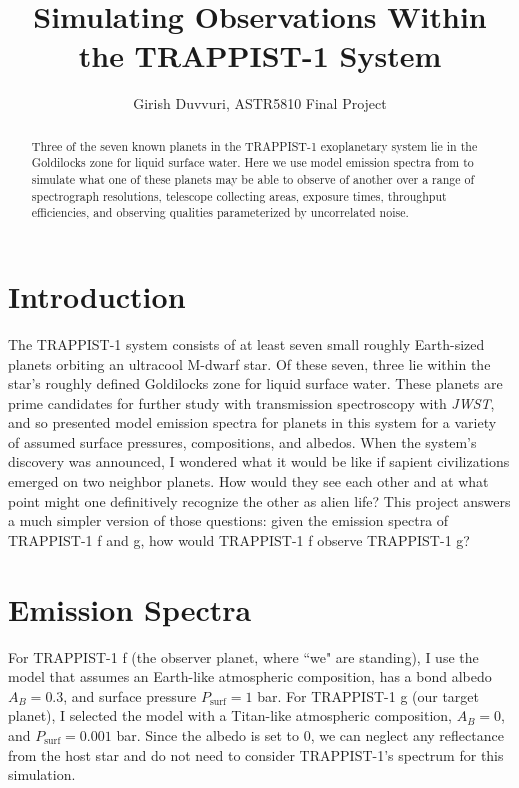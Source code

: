 \documentclass{knac}
\begin{document}
\title{Simulating Observations Within the TRAPPIST-1 System}


\author{Girish Duvvuri, ASTR5810 Final Project}

\begin{abstract}
    Three of the seven known planets in the TRAPPIST-1 exoplanetary system lie in the Goldilocks zone for liquid surface water. Here we use model emission spectra from \cite{Morley2017} to simulate what one of these planets may be able to observe of another over a range of spectrograph resolutions, telescope collecting areas, exposure times, throughput efficiencies, and observing qualities parameterized by uncorrelated noise.
\end{abstract}

\section{Introduction}

The TRAPPIST-1 system consists of at least seven small roughly Earth-sized planets orbiting an ultracool M-dwarf star. Of these seven, three lie within the star's roughly defined Goldilocks zone for liquid surface water. These planets are prime candidates for further study with transmission spectroscopy with \emph{JWST}, and so \cite{Morley2017} presented model emission spectra for planets in this system for a variety of assumed surface pressures, compositions, and albedos. When the system's discovery was announced, I wondered what it would be like if sapient civilizations emerged on two neighbor planets. How would they see each other and at what point might one definitively recognize the other as alien life? This project answers a much simpler version of those questions: given the emission spectra of TRAPPIST-1 f and g, how would TRAPPIST-1 f observe TRAPPIST-1 g?

\section{Emission Spectra}
For TRAPPIST-1 f (the observer planet, where ``we" are standing), I use the model that assumes an Earth-like atmospheric composition, has a bond albedo $A_B = 0.3$, and surface pressure $P_\mathrm{surf} = 1$ bar. For TRAPPIST-1 g (our target planet), I selected the model with a Titan-like atmospheric composition, $A_B = 0$, and $P_\mathrm{surf} = 0.001$ bar. Since the albedo is set to 0, we can neglect any reflectance from the host star and do not need to consider TRAPPIST-1's spectrum for this simulation. 
\end{document}
